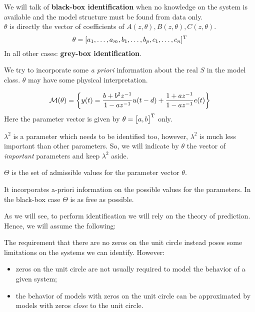 We will talk of \textbf{black-box identification} when no knowledge on the system is available and the model structure must be found from data only.\\
$\theta$ is directly the vector of coefficients of $A(z, \theta),B(z, \theta),C(z, \theta)$.
$$
	\theta=[a_{1},\ldots,a_{m},b_{1},\ldots,b_{p},c_{1},\ldots,c_{n}]^{\mathrm{T}}
$$
In all other cases: \textbf{grey-box identification}.

We try to incorporate some \emph{a priori} information about the real $S$ in the model class. $\theta$ may have some physical interpretation.

\begin{exa}
$$
	\mathcal{M}(\theta) = \left\{ y(t)=\frac{b+b^{2} z^{-1}}{1-a z^{-1}} u(t-d)+\frac{1+a z^{-1}}{1-a z^{-1}} e(t) \right\}  
$$
Here the parameter vector is given by $\theta=\begin{bmatrix}a,b\end{bmatrix}^{\mathrm{T}}$ only.
\end{exa}

\begin{rem}
$\lambda^2$ is a parameter which needs to be identified too, however, $\lambda^2$ is much less important than other parameters. So, we will indicate by $\theta$ the vector of \emph{important} parameters and keep $\lambda^2$ aside.
\end{rem}

$\Theta$ is the set of admissible values for the parameter vector $\theta$.

It incorporates a-priori information on the possible values for the parameters. In the black-box case $\Theta$ is as free as possible.

As we will see, to perform identification we will rely on the theory of prediction. Hence, we will assume the following:


The requirement that there are no zeros on the unit circle instead poses some limitations on the systems we can identify. However:
\begin{itemize}
	\item zeros on the unit circle are not usually required to model the behavior of a given system;
	\item the behavior of models with zeros on the unit circle can be approximated by models with zeros \emph{close} to the unit circle.
\end{itemize} 

